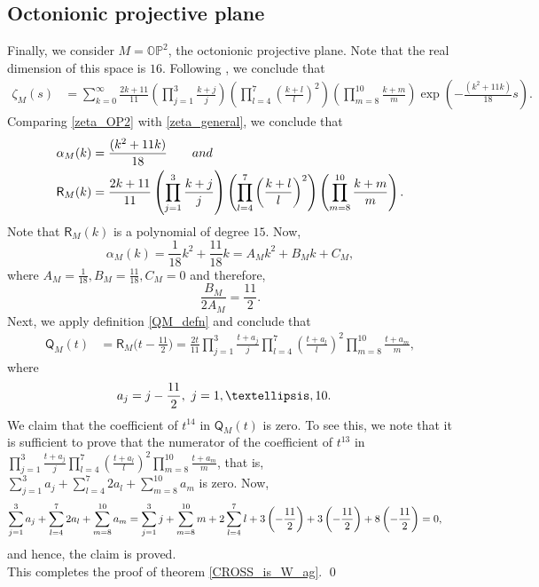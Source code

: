 \documentclass[11pt,lettersize,reqno,fullpage]{amsart}
\begin{document}
\subsection{Octonionic projective plane}
Finally, we consider $M=\mathbb{OP}^2$, the octonionic projective plane.  
Note that the real dimension of this space is $16$. 
Following 
\cite[page 11, theorem 6.2]{Cahn}, we conclude that 
\begin{align}
\zeta_{M}(s) & = \sum_{k=0}^{\infty} \frac{2k+11}{11} 
\left(\prod_{j=1}^{3} \frac{k+j}{j}\right) \left(\prod_{l=4}^{7} \left(\frac{k+l}{l}\right)^2\right) 
\left(\prod_{m=8}^{10} \frac{k+m}{m}\right)  \exp\left(-\frac{(k^2+11k)}{18}s\right). \label{zeta_OP2}
\end{align}
Comparing \eqref{zeta_OP2} with \eqref{zeta_general}, we conclude that 
\begin{align}
\alpha_{M}(k)& = \frac{(k^2+11k)}{18} \qquad \textnormal{and} \nonumber \\ 
\mathsf{R}_{M}(k) & = 
\frac{2k+11}{11} 
\left(\prod_{j=1}^{3} \frac{k+j}{j}\right) \left(\prod_{l=4}^{7} \left(\frac{k+l}{l}\right)^2\right) 
\left(\prod_{m=8}^{10} \frac{k+m}{m}\right).  \nonumber 
\end{align}
Note that $\mathsf{R}_{M}(k)$ is a polynomial of degree $15$.  Now, 
\[\alpha_{M}(k)=\frac{1}{18}k^{2}+\frac{11}{18}k=A_{M}k^{2}+B_{M}k+C_{M}, \]
where $A_{M}=\frac{1}{18}, B_{M}=\frac{11}{18}, C_{M}=0 $ and therefore, 
\[\frac{B_{M}}{2 A_{M}}=\frac{11}{2}. \] 
Next, we apply definition \eqref{QM_defn} and conclude that 
\begin{align}
\mathsf{Q}_{M}(t) & = \mathsf{R}_{M}\Big(t-\frac{11}{2}\Big)= \frac{2t}{11} \prod_{j=1}^{3} \frac{t+a_{j}}{j} \prod_{l=4}^{7} \left( \frac{t+a_{l}}{l} \right)^{2} \prod_{m=8}^{10} \frac{t+a_{m}}{m},
\end{align}
where
\begin{equation}
\begin{aligned}
a_{j}&= j-\frac{11}{2}, \ j=1,\dots,10.
\end{aligned}
\notag
\end{equation}
We claim that the coefficient of $t^{14} $ in $\mathsf{Q}_{M}(t)$ is zero. To see this, we note that it is sufficient to prove that the numerator of the coefficient of $t^{13} $ in $ \prod_{j=1}^{3} \frac{t+a_{j}}{j} \prod_{l=4}^{7} \left( \frac{t+a_{l}}{l} \right)^{2} \prod_{m=8}^{10} \frac{t+a_{m}}{m} $, that is, $\sum_{j=1}^{3} a_{j}+\sum_{l=4}^{7} 2a_{l} +\sum_{m=8}^{10} a_{m} $ is zero. Now,
\begin{equation}
\begin{aligned}
\sum_{j=1}^{3} a_{j}+\sum_{l=4}^{7} 2a_{l} +\sum_{m=8}^{10} a_{m}&=\sum_{j=1}^{3} j+\sum_{m=8}^{10} m+2 \sum_{l=4}^{7} l+ 3 \left( -\frac{11}{2}\right)+ 3  \left( -\frac{11}{2}\right)+8  \left( -\frac{11}{2}\right)=0,
\end{aligned}
\notag
\end{equation}
and hence, the claim is proved.\\
%
This completes the proof of theorem \ref{CROSS_is_W_ag}. \qed 
 
\end{document}
